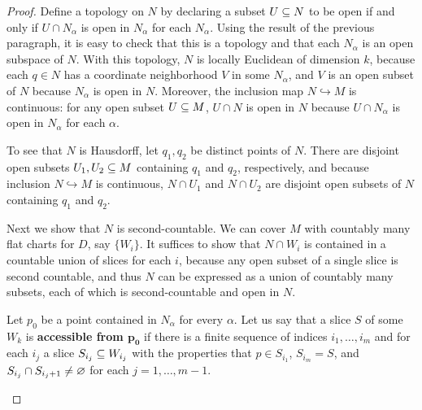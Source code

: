 \begin{proof}
Define a topology on $N$ by declaring a subset $U\subseteq N$ to be open if and only if $U\cap N_\alpha$ is open in $N_\alpha$ for each $N_\alpha$. Using the result of the previous paragraph, it is easy to check that this is a topology and that each $N_\alpha$ is an open subspace of $N$. With this topology, $N$ is locally Euclidean of dimension $k$, because each $q\in N$ has a coordinate neighborhood $V$ in some $N_\alpha$, and $V$ is an open subset of $N$ because $N_\alpha$ is open in $N$. Moreover, the inclusion map $N\hookrightarrow M$ is continuous: for any open subset $U\subseteq M$, $U\cap N$ is open in $N$ because $U\cap N_\alpha$ is open in $N_\alpha$ for each $\alpha$.\par
To see that $N$ is Hausdorff, let $q_1,q_2$ be distinct points of $N$. There are disjoint open subsets $U_1,U_2\subseteq M$ containing $q_1$ and $q_2$, respectively, and because inclusion $N\hookrightarrow M$ is continuous, $N\cap U_1$ and $N\cap U_2$ are disjoint open subsets of $N$ containing $q_1$ and $q_2$.\par
Next we show that $N$ is second-countable. We can cover $M$ with countably many flat charts for $D$, say $\{W_i\}$. It suffices to show that $N\cap W_i$ is contained in a countable union of slices for each $i$, because any open subset of a single slice is second countable, and thus $N$ can be expressed as a union of countably many subsets, each of which is second-countable and open in $N$.\par
Let $p_0$ be a point contained in $N_\alpha$ for every $\alpha$. Let us say that a slice $S$ of some $W_k$ is \textbf{accessible from $\bm{p_0}$} if there is a finite sequence of indices $i_1,\dots,i_m$ and for each $i_j$ a slice $S_{i_j}\subseteq W_{i_j}$ with the properties that $p\in S_{i_1}$, $S_{i_m}=S$, and $S_{i_j}\cap S_{i_j+1}\neq\varnothing$ for each $j=1,\dots,m-1$.
\begin{figure}[htbp]
\centering

\end{figure}
\end{proof}
